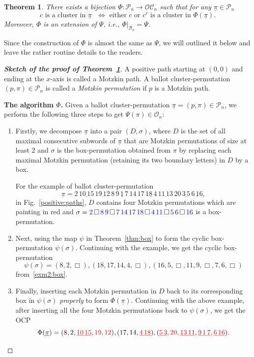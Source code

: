 \documentclass[12pt]{amsart}
\numberwithin{equation}{section}
\def\blue{\textcolor{blue}}
\def\red{\textcolor{red}}
\theoremstyle{plain}
\newtheorem{theorem}{Theorem}[section]
\theoremstyle{definition}
\newcommand{\PP}{\mathcal{P}}
\newcommand{\B}{\mathcal{B}}
\newcommand{\C}{\mathcal{OC}}
\newcommand{\Od}{\mathcal{O}}
\begin{document}
 
\begin{theorem}\label{thm:ext}
There exists a bijection $\Phi: \PP_n\rightarrow\C_n$ such that for any $\underline{\pi}\in\PP_n$
\begin{equation}\label{cluster}
\text{$c$ is a cluster in $\underline{\pi}$ } \Longleftrightarrow \text{ either $c$ or $c^r$ is a cluster in $\Phi(\underline{\pi})$}.
\end{equation}
Moreover, $\Phi$ is an extension of $\Psi$, i.e., $\Phi|_{\B_n}=\Psi$.  
\end{theorem}
 Since the construction of $\Phi$ is almost the same as $\Psi$, we will outlined it below and leave the rather routine details to the readers.
 \begin{proof}[{\bf Sketch of the proof of Theorem~\ref{thm:ext}}] A positive path starting at $(0,0)$ and ending at the $x$-axis is called a Motzkin path. A ballot cluster-permutation $(p,\pi)\in\PP_n$ is called a {\em Motzkin permutation} if $p$ is a Motzkin path. 
 
 {\bf The algorithm $\Phi$.} Given a ballot cluster-permutation $\underline{\pi}=(p,\pi)\in\PP_n$, we perform the following three steps to get $\Psi(\pi)\in\Od_n$:
\begin{enumerate}
\item Firstly, we  decompose $\underline{\pi}$ into a pair $(D,\sigma)$, where $D$ is the set of all maximal consecutive subwords of $\underline{\pi}$ that are Motzkin permutations of size at least $2$ and $\sigma$ is the box-permutation obtained from $\pi$ by replacing each maximal Motzkin permutation (retaining its two boundary letters)  in $D$ by a box. 

 For the example of  ballot cluster-permutation 
 $$
\underline{\pi}=2\,\underline{10\,15}\,19\,12\,8\,\underline{9\,1\,7}\,14\,17\,\underline{18\,4}\,\underline{11\,13}\,20\,\underline{3\,5}\,\underline{6\,16},
$$
in Fig.~\ref{positive:paths}, $D$ contains four Motzkin permutations which are painting in red and $\sigma=\blue{2}\,\Box\,\blue{8\,9}\,\Box\,\blue{7\,14\,17\,18}\,\Box\,\blue{4\,11}\,\Box\,\blue{5\,6}\,\Box\,\blue{16}$ is a box-permutation. 
\item Next, using the map $\psi$ in Theorem~\ref{thm:box} to form the cyclic box-permutation $\psi(\sigma)$. 
Continuing with the example, we get the cyclic box-permutation
$$
\psi(\sigma)=(8,2,\Box),(18,17,14,4,\Box),(16,5,\Box,11,9,\Box,7,6,\Box)
$$
 from~\eqref{exm2:box}. 
 \item Finally, inserting each Motzkin permutation in $D$ back to its corresponding box in $\psi(\sigma)$ {\em properly} to form  $\Phi(\underline{\pi})$. 
 Continuing with the above example, after inserting all the four Motzkin permutations back to $\psi(\sigma)$, we get the OCP
 $$
\Phi(\underline{\pi})=(8,2,\red{\underline{10\, 15}, 19,12}),(17,14,\red{\underline{4\,18}}),(\red{\underline{5\,3},20,\underline{13\,11}},\red{\underline{9\,1\,7}},\red{\underline{6\,16}}). 
 $$
 \end{enumerate}
 

\end{proof}
\end{document}
